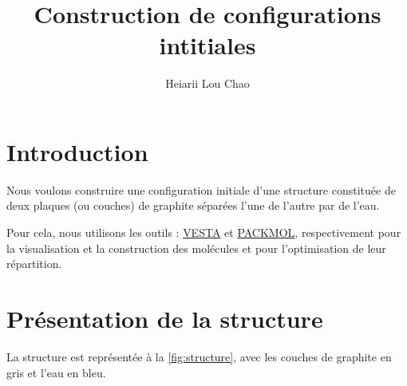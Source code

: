 \documentclass[11pt, a4paper]{article}
\title{Construction de configurations intitiales}
\author{Heiarii Lou Chao}
\begin{document}
\maketitle

\section{Introduction}

Nous voulons construire une configuration initiale d'une structure constituée de deux plaques (ou couches) de graphite séparées l'une de l'autre par de l'eau.

Pour cela, nous utilisons les outils : \href{https://jp-minerals.org/vesta/en/}{VESTA} et \href{https://m3g.github.io/packmol/index.html}{PACKMOL}, respectivement pour la visualisation et la construction des molécules et pour l'optimisation de leur répartition.

\section{Présentation de la structure}

La structure est représentée à la \autoref{fig:structure}, avec les couches de graphite en gris et l'eau en bleu.
\end{document}
